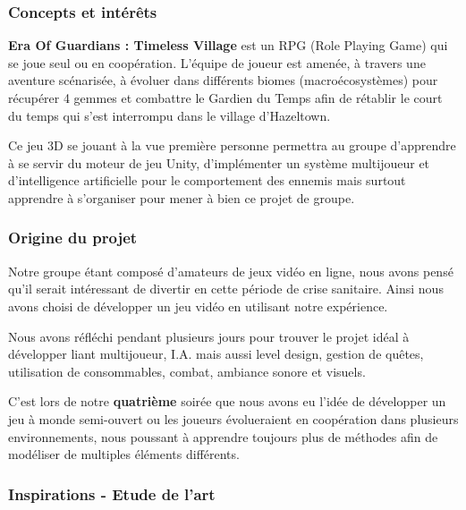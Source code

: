 \documentclass[12pt]{article}
\begin{document}
            \subsubsection{Concepts et intérêts}
                \textbf{Era Of Guardians : Timeless Village} est un RPG (Role Playing Game) qui se joue seul ou en coopération. L'équipe de joueur est amenée, à travers une aventure scénarisée, à évoluer dans différents biomes (macroécosystèmes) pour récupérer 4 gemmes et combattre le Gardien du Temps afin de rétablir le court du temps qui s'est interrompu dans le village d'Hazeltown.
                \\
                \par Ce jeu 3D se jouant à la vue première personne permettra au groupe d'apprendre à se servir du moteur de jeu Unity, d'implémenter un système multijoueur et d'intelligence artificielle pour le comportement des ennemis mais surtout apprendre à s'organiser pour mener à bien ce projet de groupe.
                \\
                
            \subsubsection{Origine du projet}
                Notre groupe étant composé d'amateurs de jeux vidéo en ligne, nous avons pensé qu'il serait intéressant de divertir en cette période de crise sanitaire. Ainsi nous avons choisi de développer un jeu vidéo en utilisant notre expérience.
                \\
                \par Nous avons réfléchi pendant plusieurs jours pour trouver le projet idéal à développer liant multijoueur, I.A. mais aussi level design, gestion de quêtes, utilisation de consommables, combat, ambiance sonore et visuels.
                \\
                \par C'est lors de notre \textbf{quatrième} soirée que nous avons eu l'idée de développer un jeu à monde semi-ouvert ou les joueurs évolueraient en coopération dans plusieurs environnements, nous poussant à apprendre toujours plus de méthodes afin de modéliser de multiples éléments différents.
            
                \clearpage
                
            \subsubsection{Inspirations - Etude de l'art}
                
\end{document}
